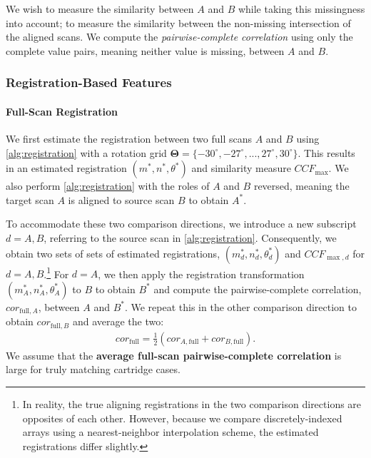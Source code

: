 \documentclass[
]{jdssv}
\begin{document}
We wish to measure the similarity between \(A\) and \(B\) while taking
this missingness into account; to measure the similarity between the
non-missing intersection of the aligned scans. We compute the
\emph{pairwise-complete correlation} using only the complete value
pairs, meaning neither value is missing, between \(A\) and \(B\).

\hypertarget{registration-based-features}{%
\subsubsection{Registration-Based
Features}\label{registration-based-features}}

\hypertarget{full-scan-registration}{%
\paragraph{Full-Scan Registration}\label{full-scan-registration}}

We first estimate the registration between two full scans \(A\) and
\(B\) using \autoref{alg:registration} with a rotation grid
\(\pmb{\Theta} = \{-30^\circ, -27^\circ,...,27^\circ,30^\circ\}\). This
results in an estimated registration \((m^*,n^*,\theta^*)\) and
similarity measure \(CCF_{\max}\). We also perform
\autoref{alg:registration} with the roles of \(A\) and \(B\) reversed,
meaning the target scan \(A\) is aligned to source scan \(B\) to obtain
\(A^*\).

To accommodate these two comparison directions, we introduce a new
subscript \(d = A,B\), referring to the source scan in
\autoref{alg:registration}. Consequently, we obtain two sets of sets of
estimated registrations, \((m^*_d,n^*_d,\theta^*_d)\) and
\(CCF_{\max,d}\) for
\(d=A,B\).\footnote{In reality, the true aligning registrations in the two comparison directions are opposites of each other. However, because we compare discretely-indexed arrays using a nearest-neighbor interpolation scheme, the estimated registrations differ slightly.}
For \(d = A\), we then apply the registration transformation
\((m^*_A,n^*_A,\theta^*_A)\) to \(B\) to obtain \(B^*\) and compute the
pairwise-complete correlation, \(cor_{\text{full},A}\), between \(A\)
and \(B^*\). We repeat this in the other comparison direction to obtain
\(cor_{\text{full},B}\) and average the two: \begin{align*}
cor_{\text{full}} = \frac{1}{2}\left(cor_{A,\text{full}} + cor_{B,\text{full}}\right).
\end{align*} We assume that the \textbf{average full-scan
pairwise-complete correlation} is large for truly matching cartridge
cases.
\end{document}

